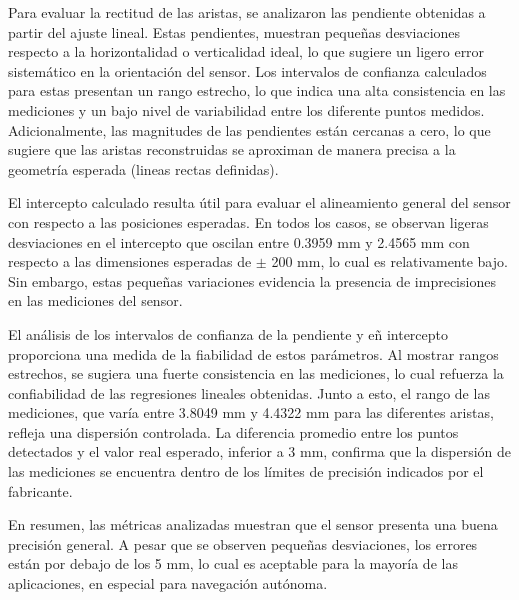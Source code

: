 Para evaluar la rectitud de las aristas, se analizaron las pendiente obtenidas a partir del ajuste lineal. Estas pendientes, muestran pequeñas desviaciones respecto a la horizontalidad o verticalidad ideal, lo que sugiere un ligero error sistemático en la orientación del sensor. Los intervalos de confianza calculados para estas presentan un rango estrecho, lo que indica una alta consistencia en las mediciones y un bajo nivel de variabilidad entre los diferente puntos medidos. Adicionalmente, las magnitudes de las pendientes están cercanas a cero, lo que sugiere que las aristas reconstruidas se aproximan de manera precisa a la geometría esperada (lineas rectas definidas). 

El intercepto calculado resulta útil para evaluar el alineamiento general del sensor con respecto a las posiciones esperadas. En todos los casos, se observan ligeras desviaciones en el intercepto que oscilan entre 0.3959 mm y 2.4565 mm con respecto a las dimensiones esperadas de  $\pm$ 200 mm, lo cual es relativamente bajo. Sin embargo, estas pequeñas variaciones evidencia la presencia de imprecisiones en las mediciones del sensor.

El análisis de los intervalos de confianza de la pendiente y eñ intercepto proporciona una medida de la fiabilidad de estos parámetros. Al mostrar rangos estrechos, se sugiera una fuerte consistencia en las mediciones, lo cual refuerza la confiabilidad de las regresiones lineales obtenidas. Junto a esto, el rango de las mediciones, que varía entre 3.8049 mm y 4.4322 mm para las diferentes aristas, refleja una dispersión controlada. La diferencia promedio entre los puntos detectados y el valor real esperado, inferior a 3 mm, confirma que la dispersión de las mediciones se encuentra dentro de los límites de precisión indicados por el fabricante. 

En resumen, las métricas analizadas muestran que el sensor presenta una buena precisión general. A pesar que se observen pequeñas desviaciones, los errores están por debajo de los 5 mm, lo cual es aceptable para la mayoría de las aplicaciones, en especial para navegación autónoma.

